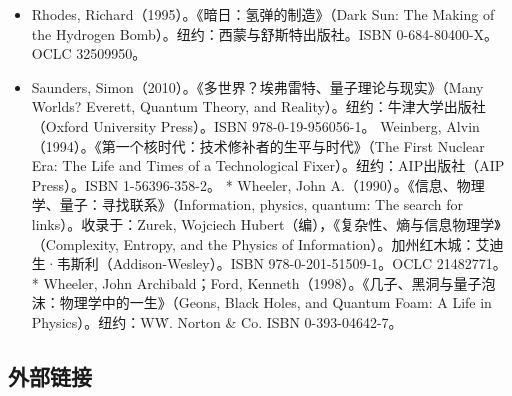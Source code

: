 \begin{itemize}
\item Rhodes, Richard（1995）。《暗日：氢弹的制造》（Dark Sun: The Making of the Hydrogen Bomb）。纽约：西蒙与舒斯特出版社。ISBN 0-684-80400-X。OCLC 32509950。
\item Saunders, Simon（2010）。《多世界？埃弗雷特、量子理论与现实》（Many Worlds? Everett, Quantum Theory, and Reality）。纽约：牛津大学出版社（Oxford University Press）。ISBN 978-0-19-956056-1。
Weinberg, Alvin（1994）。《第一个核时代：技术修补者的生平与时代》（The First Nuclear Era: The Life and Times of a Technological Fixer）。纽约：AIP出版社（AIP Press）。ISBN 1-56396-358-2。
* Wheeler, John A.（1990）。《信息、物理学、量子：寻找联系》（Information, physics, quantum: The search for links）。收录于：Zurek, Wojciech Hubert（编），《复杂性、熵与信息物理学》（Complexity, Entropy, and the Physics of Information）。加州红木城：艾迪生·韦斯利（Addison-Wesley）。ISBN 978-0-201-51509-1。OCLC 21482771。
* Wheeler, John Archibald；Ford, Kenneth（1998）。《几子、黑洞与量子泡沫：物理学中的一生》（Geons, Black Holes, and Quantum Foam: A Life in Physics）。纽约：W\.W. Norton & Co. ISBN 0-393-04642-7。

\end{itemize}
\subsection{外部链接}
